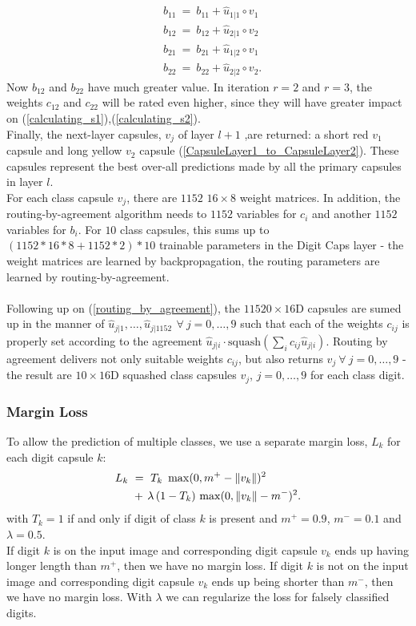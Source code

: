 \documentclass{article}
\begin{document}
{\begin{align*}
& b_{11} \ = \ b_{11} + \hat{u}_{1|1} \circ v_1 \\
& b_{12} \ = \ b_{12} + \hat{u}_{2|1} \circ v_2 \\
& b_{21} \ = \ b_{21} + \hat{u}_{1|2} \circ v_1 \\
& b_{22} \ = \ b_{22} + \hat{u}_{2|2} \circ v_2.
\end{align*}
Now $b_{12}$ and $b_{22}$ have much greater value.
In iteration $r=2$ and $r=3$, the weights $c_{12}$ and $c_{22}$ will be rated even higher, since they will have greater impact on (\ref{calculating_s1}),(\ref{calculating_s2}).\\
Finally, the next-layer capsules, $v_j$ of layer $l+1$ ,are returned: a short red $v_1$ capsule and long yellow $v_2$ capsule (\ref{CapsuleLayer1_to_CapsuleLayer2}). These capsules represent the best over-all predictions made by all the primary capsules in layer $l$. \\
For each class capsule $v_j$, there are $1152$ $16 \times 8$ weight matrices. In addition, the routing-by-agreement algorithm needs to $1152$ variables for $c_i$ and another $1152$ variables for $b_i$. For $10$ class capsules, this sums up to $\left( 1152 * 16 * 8 + 1152 * 2 \right) * 10$ trainable parameters in the Digit Caps layer - the weight matrices are learned by backpropagation, the routing parameters are learned by routing-by-agreement.
\\
\\
Following up on (\ref{routing_by_agreement}), the $11520 \times 16$D capsules are sumed up in the manner of $\hat{u}_{j|1}, \ldots , \hat{u}_{j|1152} \ \, \forall \ j=0, \ldots, 9$ such that each of the weights $c_{ij}$ is properly set according to the agreement $\hat{u}_{j|i} \cdot \text{squash}(\sum_i c_{ij} \hat{u}_{j|i})$. Routing by agreement delivers not only suitable weights $c_{ij}$, but also returns $v_j \ \forall \ j=0,\ldots, 9$ - the result are $10 \times 16$D squashed class capsules $v_j$, $ j=0, \ldots, 9 $ for each class digit.




\subsubsection{Margin Loss}

To allow the prediction of multiple classes, we use a separate margin loss, $L_k$ for each digit capsule $k$:
\begin{align}
L_k \ &= \ T_k \ \max  (0, m^+ - \lVert v_k \rVert ) ^2 \, \notag \\
&+ \, \lambda \, (1- T_k) \, \max (0, \lVert v_k \rVert - m^- )^2.
\end{align}
with $T_k = 1$ if and only if digit of class $k$ is present and $m^+ = 0.9$, $m^- = 0.1$ and $ \lambda = 0.5$.\\
If digit $k$ is on the input image and corresponding digit capsule $v_k$ ends up having longer length than $m^+$, then we have no margin loss. If digit $k$ is not on the input image and corresponding digit capsule $v_k$ ends up being shorter than $m^-$, then we have no margin loss. With $\lambda$ we can regularize the loss for falsely classified digits.

}
\end{document}
